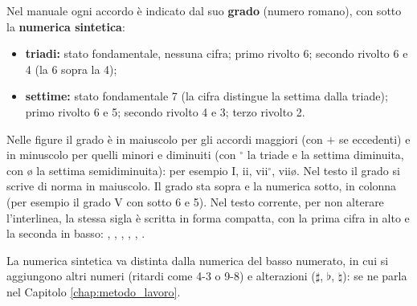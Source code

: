 \begin{regola}
	\label{reg:numerica_manuale}
	Nel manuale ogni accordo è indicato dal suo \textbf{grado} (numero romano), con sotto la \textbf{numerica sintetica}:
	\begin{itemize}
		\item \textbf{triadi:} stato fondamentale, nessuna cifra; primo rivolto 6; secondo rivolto 6 e 4 (la 6 sopra la 4);
		\item \textbf{settime:} stato fondamentale 7 (la cifra distingue la settima dalla triade); primo rivolto 6 e 5; secondo rivolto 4 e 3; terzo rivolto 2.
	\end{itemize}
	Nelle figure il grado è in maiuscolo per gli accordi maggiori (con $+$ se eccedenti) e in minuscolo per quelli minori e diminuiti (con $^\circ$ la triade e la settima diminuita, con ø la settima semidiminuita): per esempio I, ii, vii$^\circ$, viiø. Nel testo il grado si scrive di norma in maiuscolo. Il grado sta sopra e la numerica sotto, in colonna (per esempio il grado V con sotto 6 e 5). Nel testo corrente, per non alterare l'interlinea, la stessa sigla è scritta in forma compatta, con la prima cifra in alto e la seconda in basso: , , , , , .
\end{regola}

La numerica sintetica va distinta dalla numerica del basso numerato, in cui si aggiungono altri numeri (ritardi come 4-3 o 9-8) e alterazioni ($\sharp$, $\flat$, $\natural$): se ne parla nel Capitolo \ref{chap:metodo_lavoro}.
